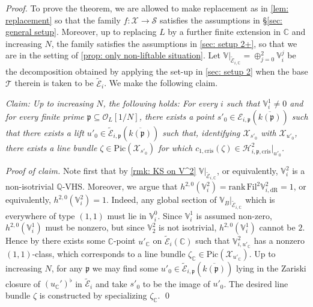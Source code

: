\documentclass[letter, 11pt]{article}
\theoremstyle{plain}
\theoremstyle{definition}
\newcommand{\IC}{\mathbb{C}}
\newcommand{\IQ}{\mathbb{Q}}
\newcommand{\IV}{\mathbb{V}}
\newcommand{\<}{\langle}
\renewcommand{\>}{\rangle}
\def\wt{\widetilde}
\newcommand{\fp}{\mathfrak{p}}
\newcommand{\sH}{\mathcal{H}}
\newcommand{\sX}{\mathcal{X}}
\newcommand{\sS}{\mathcal{S}}
\newcommand{\sT}{\mathcal{T}}
\newcommand{\sE}{\mathcal{E}}
\newcommand{\sO}{\mathcal{O}}
\newcommand{\Pic}{\mathrm{Pic}}
\newcommand{\Fil}{\mathrm{Fil}}
\newcommand{\dR}{\mathrm{dR}}
\newcommand{\cris}{\mathrm{cris}}
\begin{document}
\begin{proof}
    To prove the theorem, we are allowed to make replacement as in \ref{lem: replacement} so that the family $f : \sX \to \sS$ satisfies the assumptions in \S\ref{sec: general setup}. Moreover, up to replacing $L$ by a further finite extension in $\IC$ and increasing $N$, the family satisfies the assumptions in \ref{sec: setup 2+}, so that we are in the setting of \ref{prop: only non-liftable situation}. Let $\IV|_{\wt{\sE}_{i, \IC}} = \oplus_{j = 0}^2 \IV^j_i$ be the decomposition obtained by applying the set-up in \ref{sec: setup 2} when the base $\sT$ therein is taken to be $\wt{\sE}_i$. We make the following claim. 

    \vspace{1em}

    \noindent \textit{Claim: Up to increasing $N$, the following holds: For every $i$ such that $\IV^1_i \neq 0$ and for every finite prime $\fp \subseteq \sO_L[1/N]$, there exists a point $s'_0 \in \sE_{i, \fp}(\overline{k(\fp)})$ such that there exists a lift $u'_0 \in \wt{\sE}_{i, \fp}(\overline{k(\fp)})$ such that, identifying $\sX_{s'_0}$ with $\sX_{u'_0}$, there exists a line bundle $\zeta \in \Pic(\sX_{s'_0})$ for which $c_{1, \cris}(\zeta) \in \sH^2_{i, \fp, \cris}|_{u'_0}$.} 

    \vspace{0.5em}

    \noindent \textit{Proof of claim.} Note first that by \ref{rmk: KS on V^2} $\IV|_{\wt{\sE}_{i, \IC}}$, or equivalently, $\IV^2_{i}$ is a non-isotrivial $\IQ$-VHS. Moreover, we argue that $h^{2, 0}(\IV^2_i) = \mathrm{rank\,} \Fil^2 \IV^2_{i, \dR} = 1$, or equivalently, $h^{2, 0}(\IV^2_i) = 1$. Indeed, any global section of $\IV_B|_{\wt{\sE}_{i, \IC}}$ which is everywhere of type $(1, 1)$ must lie in $\IV^0_i$. Since $\IV^1_i$ is assumed non-zero, $h^{2,0}(\IV^1_i)$ must be nonzero, but since $\IV^2_2$ is not isotrivial, $h^{2,0}(\IV^1_i)$ cannot be $2$. Hence by \cite[Prop.~6.4]{Moonen} there exists some $\IC$-point $u'_\IC$ on $\wt{\sE}_{i}(\IC)$ such that $\IV^2_{i, u'_\IC}$ has a nonzero $(1, 1)$-class, which corresponds to a line bundle $\zeta_\IC \in \Pic(\sX_{u'_\IC})$. Up to increasing $N$, for any $\fp$ we may find some $u'_0 \in \wt{\sE}_{i, \fp}(\overline{k(\fp)})$ lying in the Zariski closure of $(u_\IC')^{\flat}$ in $\wt{\sE}_{i}$ and take $s'_0$ to be the image of $u'_0$. The desired line bundle $\zeta$ is constructed by specializing $\zeta_\IC$.  \qed \vspace{1em}


\end{proof}
\end{document}
